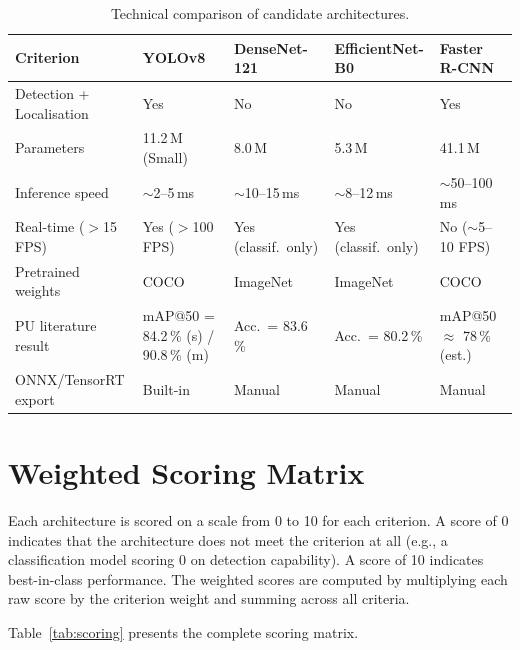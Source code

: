 \documentclass[a4paper,12pt,twoside]{report}
\begin{document}
\begin{table}[htbp]
  \centering
  \caption{Technical comparison of candidate architectures.}
  \label{tab:tech-comparison}
  \small
  \begin{tabularx}{\textwidth}{lXXXX}
    \toprule
    \textbf{Criterion} & \textbf{YOLOv8} & \textbf{DenseNet-121} &
      \textbf{EfficientNet-B0} & \textbf{Faster R-CNN} \\
    \midrule
    Detection + Localisation
      & Yes & No & No & Yes \\
    Parameters
      & 11.2\,M (Small) & 8.0\,M & 5.3\,M & 41.1\,M \\
    Inference speed
      & $\sim$2--5\,ms & $\sim$10--15\,ms & $\sim$8--12\,ms
      & $\sim$50--100\,ms \\
    Real-time ($>$15 FPS)
      & Yes ($>$100 FPS) & Yes (classif.\ only) & Yes (classif.\ only)
      & No ($\sim$5--10 FPS) \\
    Pretrained weights
      & COCO & ImageNet & ImageNet & COCO \\
    PU literature result
      & mAP@50 = 84.2\,\% (s) / 90.8\,\% (m)
      & Acc.\ = 83.6\,\% & Acc.\ = 80.2\,\%
      & mAP@50 $\approx$ 78\,\% (est.) \\
    ONNX/TensorRT export
      & Built-in & Manual & Manual & Manual \\
    \bottomrule
  \end{tabularx}
\end{table}

\section{Weighted Scoring Matrix}
\label{sec:scoring-matrix}

Each architecture is scored on a scale from 0 to 10 for each criterion. A score
of 0 indicates that the architecture does not meet the criterion at all (e.g., a
classification model scoring 0 on detection capability). A score of 10 indicates
best-in-class performance. The weighted scores are computed by multiplying each
raw score by the criterion weight and summing across all criteria.

Table~\ref{tab:scoring} presents the complete scoring matrix.
\end{document}
